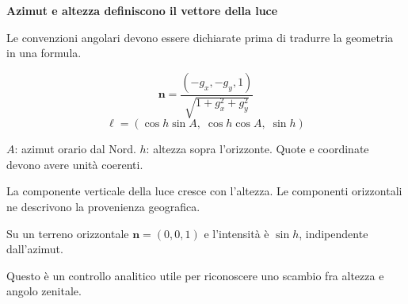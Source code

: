 \documentclass[12pt,aspectratio=1610]{beamer}
\newcommand{\PBody}[1]{\par{\fontsize{11.3}{14.8}\selectfont #1\par}}
\newcommand{\PSmall}[1]{\par{\fontsize{9.8}{13.1}\selectfont #1\par}}
\newcommand{\PInfo}[1]{%
\begin{tcolorbox}[enhanced,arc=1.6mm,boxrule=.55pt,colback=GeoTint,
 colframe=Rule!80!Classical,left=2.3mm,right=2.3mm,top=2mm,bottom=2mm,
 before skip=1mm,after skip=1mm]
\PSmall{#1}\end{tcolorbox}}
\begin{document}
\begin{frame}[plain]\hypertarget{slide68}{}
\begin{lrbox}{\TitleBox}
\begin{minipage}[t]{17.7cm}\raggedright\color{Ink}\fontsize{11.3}{14.8}\selectfont
\color{Navy}\bfseries\fontsize{20.6}{24.5}\selectfont Azimut e altezza definiscono il vettore della luce
\end{minipage}\end{lrbox}

\begin{lrbox}{\RecallBox}
\begin{minipage}[t]{14.3cm}\raggedright\color{Ink}\fontsize{11.3}{14.8}\selectfont
\fontsize{10.3}{13.8}\selectfont Le convenzioni angolari devono essere dichiarate prima di tradurre la geometria in una formula.
\end{minipage}\end{lrbox}

\begin{lrbox}{\PilotLeftBox}
\begin{minipage}[t]{10.05cm}\raggedright\color{Ink}\fontsize{11.3}{14.8}\selectfont
\[\mathbf n=\frac{(-g_x,-g_y,1)}
                        {\sqrt{1+g_x^2+g_y^2}}\]
\[\boldsymbol\ell=
       (\cos h\sin A,\;\cos h\cos A,\;\sin h)\]
\PInfo{$A$: azimut orario dal Nord. $h$: altezza sopra l’orizzonte. Quote e coordinate devono avere unità coerenti.}

\end{minipage}\end{lrbox}

\begin{lrbox}{\PilotRightBox}
\begin{minipage}[t]{7.55cm}\raggedright\color{Ink}\fontsize{11.3}{14.8}\selectfont
\PBody{La componente verticale della luce cresce con l’altezza. Le componenti orizzontali ne descrivono la provenienza geografica.}
\vspace{2.5mm}
\PBody{Su un terreno orizzontale $\mathbf n=(0,0,1)$ e l’intensità è $\sin h$, indipendente dall’azimut.}
\vspace{2.5mm}
\PSmall{Questo è un controllo analitico utile per riconoscere uno scambio fra altezza e angolo zenitale.}


\end{minipage}
\end{lrbox}
\end{frame}
\end{document}
